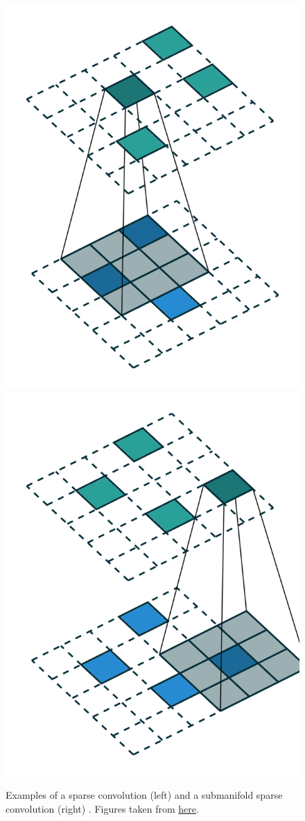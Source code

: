 \documentclass[8pt]{refart}
\begin{document}
\begin{figure}[H]
    \centering
    \includegraphics[width=.49\linewidth]{graphics/conv_sparse (1).png}
    \includegraphics[width=.49\linewidth]{graphics/conv_sparse_conv.png}
    \caption{Examples of a sparse convolution (left) \cite{Graham} and a submanifold sparse convolution (right) \cite{SparseConvNet1}.  Figures taken from \href{https://nvidia.github.io/MinkowskiEngine/sparse_tensor_network.html}{here}.}
    \label{fig:my_label}
\end{figure}


\end{document}
